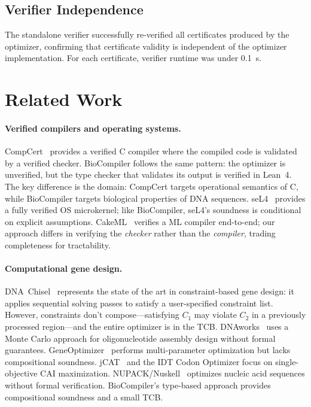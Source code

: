 \documentclass[runningheads]{llncs}
\begin{document}
\subsection{Verifier Independence}

The standalone verifier successfully re-verified all certificates
produced by the optimizer, confirming that certificate validity is
independent of the optimizer implementation.
For each certificate, verifier runtime was under 0.1~s.

\section{Related Work}\label{sec:related}

\paragraph{Verified compilers and operating systems.}
CompCert~\cite{leroy2009compcert} provides a verified C compiler where
the compiled code is validated by a verified checker.
BioCompiler follows the same pattern: the optimizer is unverified, but
the type checker that validates its output is verified in Lean~4.
The key difference is the domain: CompCert targets operational
semantics of C, while BioCompiler targets biological properties of DNA
sequences.
seL4~\cite{klein2014sel4} provides a fully verified OS microkernel;
like BioCompiler, seL4's soundness is conditional on explicit
assumptions.
CakeML~\cite{kumar2014cakeml} verifies a ML compiler end-to-end; our
approach differs in verifying the \emph{checker} rather than the
\emph{compiler}, trading completeness for tractability.

\paragraph{Computational gene design.}
DNA~Chisel~\cite{piret2020dnachisel} represents the state of the art
in constraint-based gene design: it applies sequential solving passes
to satisfy a user-specified constraint list.
However, constraints don't compose---satisfying $C_1$ may violate $C_2$
in a previously processed region---and the entire optimizer is in the
TCB.
DNAworks~\cite{vandenbergh2015dnaworks} uses a Monte Carlo approach
for oligonucleotide assembly design without formal guarantees.
GeneOptimizer~\cite{fath2008geneoptimizer} performs multi-parameter
optimization but lacks compositional soundness.
jCAT~\cite{gage2006jcat} and the IDT Codon Optimizer focus on
single-objective CAI maximization.
NUPACK/Nuskell~\cite{zadeh2015nupack} optimizes nucleic acid sequences
without formal verification.
BioCompiler's type-based approach provides compositional soundness and
a small TCB.
\end{document}
